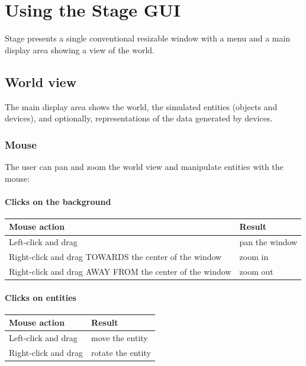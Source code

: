 \documentclass[11pt,twoside]{report}
\begin{document}


\chapter{Using the Stage GUI}

Stage presents a single conventional resizable window with a menu and
a main display area showing a view of the world.

\section{World view}
The main display area shows the world, the simulated entities (objects
and devices), and optionally, representations of the data generated
by devices. 

\subsection{Mouse}
The user can pan and zoom the world view and manipulate entities with
the mouse:

\subsubsection*{Clicks on the background}

\begin{tabular}{|l|l|}
\hline Mouse action & Result\\\hline
Left-click and drag & pan the window\\
Right-click and drag TOWARDS the center of the window & zoom in\\
Right-click and drag AWAY FROM the center of the window & zoom out\\ 
\hline
\end{tabular}

\subsubsection*{Clicks on entities}
\begin{tabular}{|l|l|}
\hline Mouse action & Result\\\hline
Left-click and drag & move the entity\\
Right-click and drag & rotate the entity\\
\hline
\end{tabular}
\end{document}
